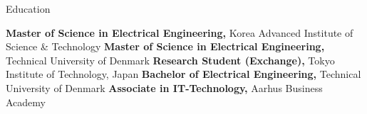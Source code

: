 \begin{rubric}{\faGraduationCap[solid] Education}

\entry*[2021 -- 2023][]%
	\textbf{Master of Science in Electrical Engineering,} Korea Advanced Institute of Science \& Technology
%
\entry*[2021 -- 2023][]%
	\textbf{Master of Science in Electrical Engineering,} Technical University of Denmark
% 
\entry*[2020][]%
	\textbf{Research Student (Exchange),} Tokyo Institute of Technology, Japan
%
\entry*[2018 -- 2020][]%
	\textbf{Bachelor of Electrical Engineering,} Technical University of Denmark
% 
\entry*[2013 -- 2015][]%
	\textbf{Associate in IT-Technology,} Aarhus Business Academy 
% 
\end{rubric}